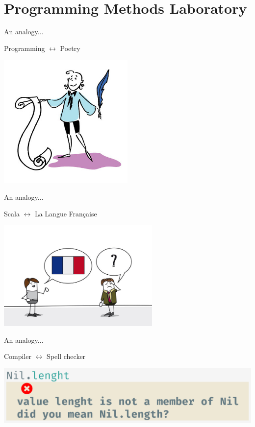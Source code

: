\documentclass[10pt]{beamer}
\newenvironment{slide}[2][]
  {\begin{frame}[fragile,environment=slide,#1]{#2}}
  {\end{frame}}
\begin{document}
\section{Programming Methods Laboratory\hspace{-2pt}}

\begin{slide}{An analogy...}
\begin{center}
\Large
Programming $\longleftrightarrow$ Poetry
\vspace{10pt}

\includegraphics[width=0.5\textwidth]{figures/poetry.jpg}
\end{center}
\end{slide}

\begin{slide}{An analogy...}
\begin{center}
\Large
Scala $\longleftrightarrow$ La Langue Française
\vspace{10pt}

\includegraphics[width=0.6\textwidth]{figures/fr.jpg}
\end{center}
\end{slide}

\begin{slide}{An analogy...}
\begin{center}
\Large
Compiler $\longleftrightarrow$ Spell checker
\vspace{10pt}

\includegraphics[width=\textwidth]{figures/nil.png}
\end{center}
\end{slide}
\end{document}
